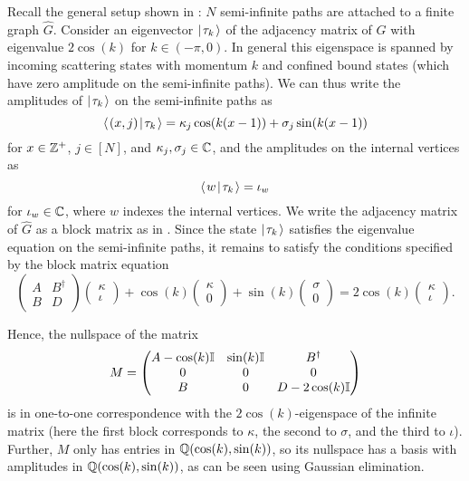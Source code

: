 \documentclass[../thesis-main/thesis-main]{subfiles}
\begin{document}
Recall the general setup shown in : $N$ semi-infinite paths are attached to a finite graph $\hat G$. Consider an eigenvector $|\mspace{2mu} \tau_k \mspace{2mu} \rangle$ of the adjacency matrix of $G$ with eigenvalue $2\cos(k)$ for $k\in (-\pi,0)$. In general this eigenspace is spanned by incoming scattering states with momentum $k$ and confined bound states \cite{CG12} (which have zero amplitude on the semi-infinite paths). We can thus write the amplitudes of $|\mspace{2mu} \tau_k \mspace{2mu} \rangle$ on the semi-infinite paths as
\begin{equation}
  \langle\mspace{2mu} (x,j) \mspace{2mu} | \mspace{2mu} \tau_k\mspace{2mu} \rangle 
  = \kappa_j \cos(k (x-1)) + \sigma_j \sin(k (x-1))
\end{equation}
for $x \in \mathbb{Z}^+$, $j \in [N]$, and $\kappa_j,\sigma_j \in \mathbb{C}$, and the amplitudes on the internal vertices as
\begin{equation}
  \langle\mspace{2mu} w \mspace{2mu} | \mspace{2mu} \tau_k\mspace{2mu} \rangle = \iota_w
\end{equation}
for $\iota_w \in \mathbb{C}$, where $w$ indexes the internal vertices. We write the adjacency matrix of $\hat{G}$ as a block matrix as in .  Since the state $|\mspace{2mu} \tau_k \mspace{2mu} \rangle$ satisfies the eigenvalue equation on the semi-infinite paths, it remains to satisfy the conditions specified by the block matrix equation
\begin{equation*}
  \begin{pmatrix} A & B^\dag\\ B & D\end{pmatrix}
	\begin{pmatrix} \kappa \\ \iota \end{pmatrix}
	+ \cos(k) \begin{pmatrix} \kappa \\ 0 \end{pmatrix}
	+ \sin(k) \begin{pmatrix} \sigma \\ 0 \end{pmatrix} 
	= 2\cos(k) \begin{pmatrix} \kappa \\ \iota \end{pmatrix}.
\end{equation*}

Hence, the nullspace of the matrix
\begin{equation}
  M= \begin{pmatrix} A -\cos(k) \mathbb{I} & \sin(k) \mathbb{I} & B^\dag\\
    0 & 0 & 0\\
    B & 0 & D-2\cos(k)\mathbb{I}\end{pmatrix}
\end{equation}
is in one-to-one correspondence with the $2\cos(k)$-eigenspace of the infinite matrix (here the first block corresponds to $\kappa$, the second to $\sigma$, and the third to $\iota$). Further, $M$ only has entries in $\mathbb{Q}(\cos(k),\sin(k))$, so its nullspace has a basis with amplitudes in $\mathbb{Q}(\cos(k),\sin(k))$, as can be seen using Gaussian elimination.
\end{document}
